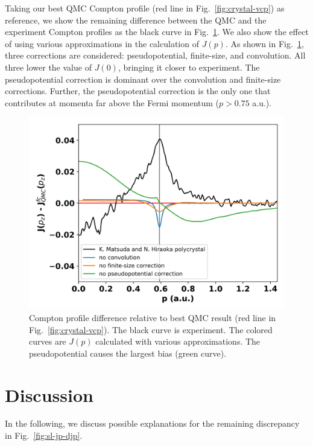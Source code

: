 \documentclass[aps,prb,showpacs,preprintnumbers,amsmath,amssymb,superscriptaddress,twocolumn]{revtex4}
\begin{document}
Taking our best QMC Compton profile (red line in Fig.~\ref{fig:crystal-vcp}) as reference, we show the remaining difference between the QMC and the experiment Compton profiles as the black curve in Fig.~\ref{fig:crystal-ppc}. We also show the effect of using various approximations in the calculation of $J(p)$. As shown in Fig.~\ref{fig:crystal-ppc}, three corrections are considered: pseudopotential, finite-size, and convolution. All three lower the value of $J(0)$, bringing it closer to experiment. The pseudopotential correction is dominant over the convolution and finite-size corrections. Further, the pseudopotential correction is the only one that contributes at momenta far above the Fermi momentum ($p>0.75$ a.u.).

\begin{figure}
\includegraphics[scale=0.48]{figures/li40_fc7-djp-qmc}
\caption{Compton profile difference relative to best QMC result (red line in Fig.~\ref*{fig:crystal-vcp}). The black curve is experiment. The colored curves are $J(p)$ calculated with various approximations. The pseudopotential causes the largest bias (green curve).\label{fig:crystal-ppc}}
\end{figure}

\section{Discussion} \label{sec:discussion}

In the following, we discuss possible explanations for the remaining discrepancy in Fig.~\ref{fig:sl-jp-djp}. %
\end{document}
